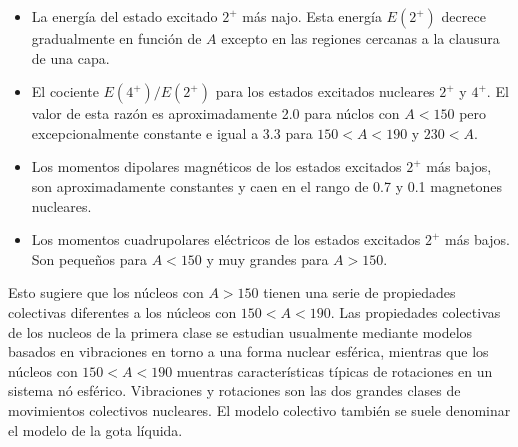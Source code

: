 \begin{itemize}
	\item La energía del estado excitado $2^+$ más najo. Esta energía $E(2^+)$ decrece gradualmente en función de $A$ excepto en las regiones cercanas a la clausura de una capa.
	\item El cociente $E(4^+)/E(2^+)$ para los estados excitados nucleares $2^+$ y $4^+$. El valor de esta razón es aproximadamente 2.0 para núclos con $A<150$ pero excepcionalmente constante e igual a 3.3 para $150<A<190$ y $230<A$. 
	\item Los momentos dipolares magnéticos de los estados excitados $2^+$ más bajos, son aproximadamente constantes y caen en el rango de 0.7 y 0.1 magnetones nucleares.
	\item Los momentos cuadrupolares eléctricos de los estados excitados $2^+$ más bajos. Son pequeños para  $A<150$ y muy grandes para $A>150$.
\end{itemize}
Esto sugiere que los núcleos con $A>150$ tienen una serie de propiedades colectivas diferentes a los núcleos con $150<A<190$. Las propiedades colectivas de los nucleos de la primera clase se estudian usualmente mediante modelos basados en vibraciones en torno a una forma nuclear esférica, mientras que los núcleos con $150<A<190$ muentras características típicas de rotaciones en un sistema nó esférico. Vibraciones y rotaciones son las dos grandes clases de movimientos colectivos nucleares. El modelo colectivo también se suele denominar el modelo de la gota líquida.
